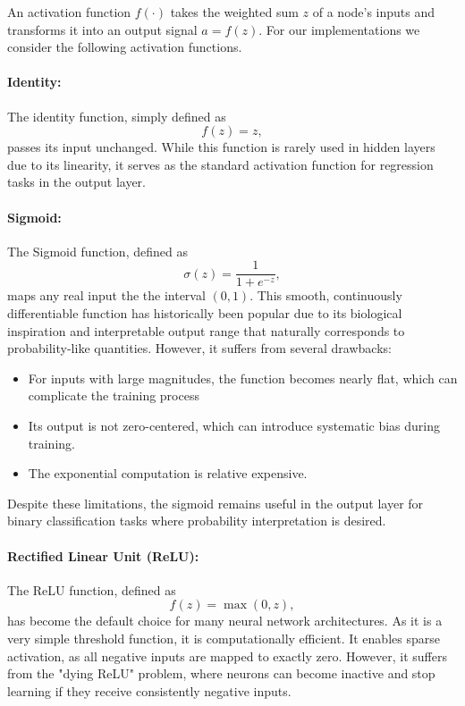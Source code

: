 \documentclass[aps,pra,english,notitlepage,reprint,nofootinbib]{revtex4-1}  %
\begin{document}
An activation function \( f(\cdot) \) takes the weighted sum \( z \) of a node's inputs and transforms it into an output signal \( a = f(z) \). For our implementations we consider the following activation functions.

\paragraph*{Identity:}
The identity function, simply defined as
\begin{equation*}
    f(z) = z,
\end{equation*}
passes its input unchanged. While this function is rarely used in hidden layers due to its linearity, it serves as the standard activation function for regression tasks in the output layer.
\paragraph*{Sigmoid:}
The Sigmoid function, defined as
\begin{equation}
    \sigma(z) = \frac{1}{1 + e^{-z}},
\end{equation}
maps any real input the the interval \( (0, 1) \). This smooth, continuously differentiable function has historically been popular due to its biological inspiration and interpretable output range that naturally corresponds to probability-like quantities. However, it suffers from several drawbacks:
\begin{itemize}
    \item For inputs with large magnitudes, the function becomes nearly flat, which can complicate the training process
    \item Its output is not zero-centered, which can introduce systematic bias during training.
    \item The exponential computation is relative expensive.
\end{itemize}

Despite these limitations, the sigmoid remains useful in the output layer for binary classification tasks where probability interpretation is desired.

\paragraph*{Rectified Linear Unit (ReLU):}
The ReLU function, defined as
\begin{equation}
    f(z) = \max(0, z),
\end{equation}
has become the default choice for many neural network architectures. As it is a very simple threshold function, it is computationally efficient. It enables sparse activation, as all negative inputs are mapped to exactly zero. However, it suffers from the "dying ReLU" problem, where neurons can become inactive and stop learning if they receive consistently negative inputs.
\end{document}

